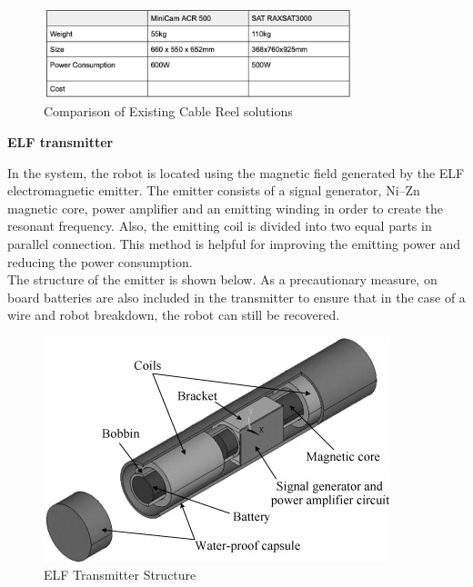 \documentclass[11pt]{article}		%
\newlength{\imageheight}	 %
\begin{document}
	        
	        \begin{figure}[h]
				\centering
				\includegraphics[width=0.8\textwidth]{cablereel.png}
				\caption{Comparison of Existing Cable Reel solutions}
				\label{comparisonReels}
			\end{figure}
	        
	        \textbf{ELF transmitter}
	        
	        In the system, the robot is located using the magnetic field generated by the ELF electromagnetic emitter. 
	        The emitter consists of a signal generator, Ni–Zn magnetic core, power amplifier and an emitting winding in order to create the resonant frequency. 
	        Also, the emitting coil is divided into two equal parts in parallel connection. 
	        This method is helpful for improving the emitting power and reducing the power consumption. 
	        \\
	        \hspace*{3ex}The structure of the emitter is shown below. 
	        As a precautionary measure, on board batteries are also included in the transmitter to ensure that in the case of a wire and robot breakdown, the robot can still be recovered.    
	        
	        \begin{figure}[h]
				\centering
				\includegraphics[height=\imageheight]{ELFtransmitter.jpg}
				\caption{ELF Transmitter Structure}
				\label{ELF transmitter}
			\end{figure}
			
\end{document}
